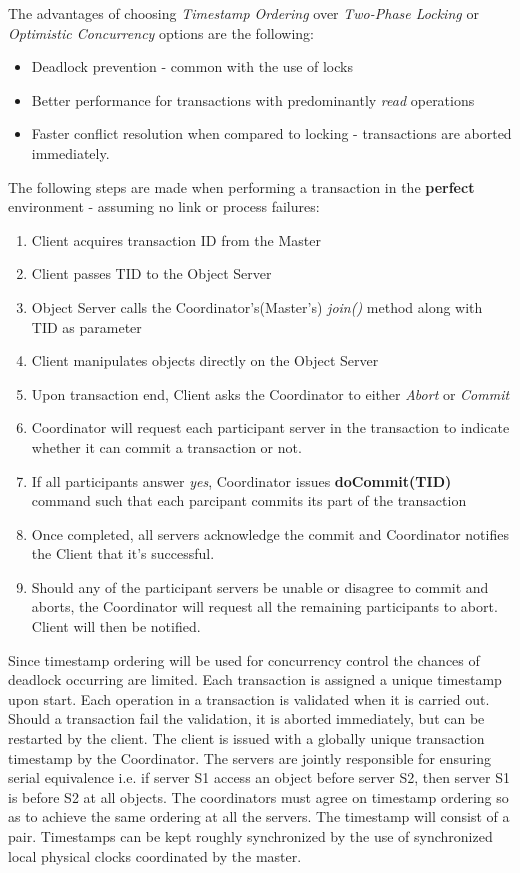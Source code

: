 \documentclass[times, 10pt,twocolumn]{article}
\begin{document}
The advantages of choosing {\it Timestamp Ordering} over {\it Two-Phase Locking} or {\it Optimistic Concurrency} options are the following: 
\begin{itemize}[noitemsep,nolistsep]
\item Deadlock prevention - common with the use of locks
\item Better performance for transactions with predominantly {\it read} operations \cite{bernstein1987concurrency}
\item Faster conflict resolution when compared to locking - transactions are aborted immediately.
\end{itemize}

The following steps are made when performing a transaction in the {\bf perfect} environment - assuming no link or process failures: 
\begin{enumerate}
\item Client acquires transaction ID from the Master
\item Client passes TID to the Object Server
\item Object Server calls the Coordinator's(Master's) {\it join()} method along with TID as parameter
\item Client manipulates objects directly on the Object Server
\item Upon transaction end, Client asks the Coordinator to either {\it Abort} or {\it Commit} 
\item Coordinator will request each participant server in the transaction to indicate whether it can commit a transaction or not.
\item If all participants answer {\it yes}, Coordinator issues {\bf doCommit(TID)} command such that each parcipant commits its part of the transaction
\item Once completed, all servers acknowledge the commit and Coordinator notifies the Client that it's successful.
\item Should any of the participant servers be unable or disagree to commit and aborts, the Coordinator will request all the remaining participants to abort. Client will then be notified.
\end{enumerate}

\label{subsec:dldetect}
Since timestamp ordering will be used for concurrency control the chances of deadlock occurring are limited.
Each transaction is assigned a unique timestamp upon start. Each operation in a transaction is validated when it is carried out.
Should a transaction fail the validation, it is aborted immediately, but can be restarted by the client. The client is issued with a globally unique transaction timestamp by the Coordinator. The servers are jointly responsible for ensuring serial equivalence i.e. if server S1 access an object before server S2, then server S1 is before S2 at all objects. The coordinators must agree on timestamp ordering so as to achieve the same ordering at all the servers. The timestamp will consist of a {\it <local timestamp, server-id> } pair. Timestamps can be kept roughly synchronized by the use of synchronized local physical clocks coordinated by the master.
\end{document}
